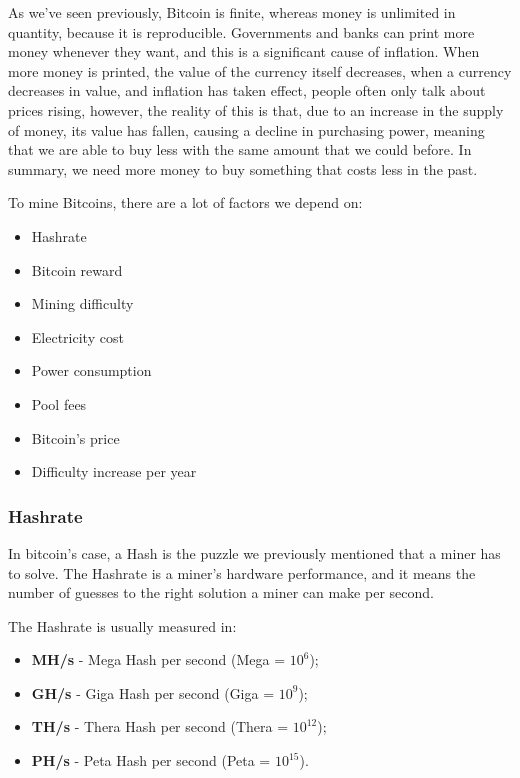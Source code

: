 \documentclass{article}
\begin{document}
 As we've seen previously, Bitcoin is finite, whereas money is unlimited in quantity, because it is reproducible. Governments and banks can print more money whenever they want, and this is a significant cause of inflation. When more money is printed, the value of the currency itself decreases, when a currency decreases in value, and inflation has taken effect, people often only talk about prices rising, however, the reality of this is that, due to an increase in the supply of money, its value has fallen, causing a decline in purchasing power, meaning that we are able to buy less with the same amount that we could before.
 In summary, we need more money to buy something that costs less in the past.
 
 To mine Bitcoins, there are a lot of factors we depend on:
 \begin{itemize}
     \item Hashrate
     \item Bitcoin reward
     \item Mining difficulty
     \item Electricity cost
     \item Power consumption
     \item Pool fees
     \item Bitcoin's price
     \item Difficulty increase per year
 \end{itemize}
 
 \subsubsection{Hashrate}
 
 In bitcoin's case, a Hash is the puzzle we previously mentioned that a miner has to solve. The Hashrate is a miner's hardware performance, and it means the number of guesses to the right solution a miner can make per second.
 
 The Hashrate is usually measured in:
 
 \begin{itemize}
     \item \textbf{MH/s} - Mega Hash per second (Mega = \(10^6\));
     \item \textbf{GH/s} - Giga Hash per second (Giga = \(10^9\));
     \item \textbf{TH/s} - Thera Hash per second (Thera = \(10^{12}\));
     \item \textbf{PH/s} - Peta Hash per second (Peta = \(10^{15}\)).
 \end{itemize}
 
\end{document}
